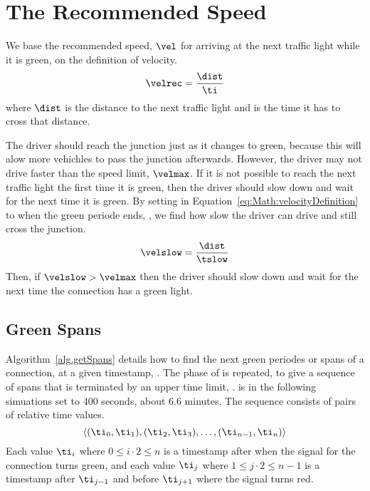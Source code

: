 \section{The Recommended Speed}\label{sec:Math}

We base the recommended speed, $\vel$ for arriving at the next traffic light while it is green, on the definition of velocity.
\begin{eqnarray}
\velrec = \frac{\dist}{\ti}\label{eq:Math:velocityDefinition}
\end{eqnarray}
where $\dist$ is the distance to the next traffic light and \ti is the time it has to cross that distance.

The driver should reach the junction just as it changes to green, because this will alow more vehichles to pass the junction afterwards.
However, the driver may not drive faster than the speed limit, $\velmax$.
If it is not possible to reach the next traffic light the first time it is green, then the driver should slow down and wait for the next time it is green.
By setting \ti in Equation~\ref{eq:Math:velocityDefinition} to when the green periode ends, \tslow, we find how slow the driver can drive and still cross the junction.
\begin{eqnarray}
\velslow = \frac{\dist}{\tslow}\label{eq:Math:velocitySlow}
\end{eqnarray}
Then, if $\velslow > \velmax$ then the driver should slow down and wait for the next time the connection has a green light.

\subsection{Green Spans}\label{sec:greenSpans}
Algorithm~\ref{alg.getSpans} details how to find the next green periodes or spans of a connection, \con at a given timestamp, \ti. 
The phase of \con is repeated, to give a sequence of spans that is terminated by an upper time limit, \tmax.
\tmax is in the following simuations set to 400 seconds, about $6.6$ minutes. %
The sequence consists of pairs of relative time values.
\[\langle(\ti_0, \ti_1), (\ti_2, \ti_3), \dots, (\ti_{n-1}, \ti_n)\rangle\]
Each value $\ti_i$ where $0\leq i\cdot 2\leq n$ is a timestamp after \ti when the signal for the connection turns green, and each value $\ti_j$ where $1\leq j\cdot 2\leq n-1$ is a timestamp after $\ti_{j-1}$ and before $\ti_{j+1}$ where the signal turns red.

